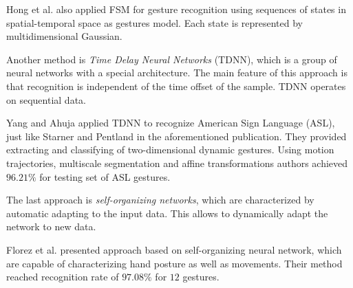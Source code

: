 Hong et al. \cite{Hong00constructingfinite} also applied FSM for gesture recognition using sequences of states in spatial-temporal space as gestures model. Each state is represented by multidimensional Gaussian.

Another method is \emph{Time Delay Neural Networks} (TDNN), which is a group of neural networks with a special architecture. The main feature of this approach is that recognition is independent of the time offset of the sample. TDNN operates on sequential data.

Yang and Ahuja \cite{YangAhujaComputerVision} applied TDNN to recognize American Sign Language (ASL), just like Starner and Pentland in the aforementioned publication. They provided extracting and classifying of two-dimensional dynamic gestures. Using motion trajectories, multiscale segmentation and affine transformations authors achieved $96.21\%$ for testing set of ASL gestures.

The last approach is \emph{self-organizing networks}, which are characterized by automatic adapting to the input data. This allows to dynamically adapt the network to new data.

Florez et al. \cite{Florez:2002:HGR:874061.875461} presented approach based on self-organizing neural network, which are capable of characterizing hand posture as well as movements. Their method reached recognition rate of $97.08\%$ for $12$ gestures.
